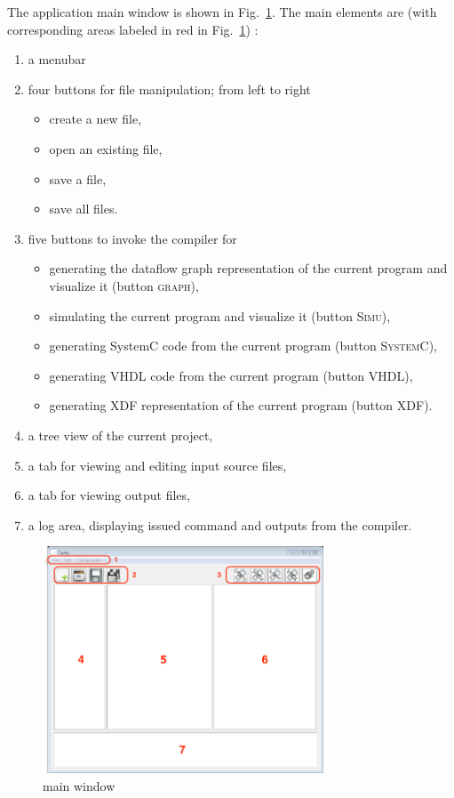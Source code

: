 \medskip
The application main window is shown in Fig.~\ref{fig:main-window}. 
The main elements are (with corresponding areas labeled in red in Fig.~\ref{fig:main-window}) :
\begin{enumerate}
\item a menubar
\item four buttons for file manipulation; from left to right
  \begin{itemize}
  \item create a new file,
  \item open an existing file,
  \item save a file,
  \item save all files.
  \end{itemize}
\item five buttons to invoke the compiler for
  \begin{itemize}
  \item generating the dataflow graph representation of the current program and visualize it (button \textsc{graph}),
  \item simulating the current program and visualize it (button \textsc{Simu}),
  \item generating SystemC code from the current program (button \textsc{SystemC}),
  \item generating VHDL code from the current program (button \textsc{VHDL}),
  \item generating XDF representation of the current program (button \textsc{XDF}).
  \end{itemize}
\item a tree view of the current project,
\item a tab for viewing and editing input source files,
\item a tab for viewing output files,
\item a log area, displaying issued command and outputs from the compiler.
\end{enumerate}

\begin{figure}[h]
  \centering
  \includegraphics[width=0.75\textwidth]{figs/ide/main-window}
  \caption{\caphy main window}
  \label{fig:main-window}
\end{figure}

